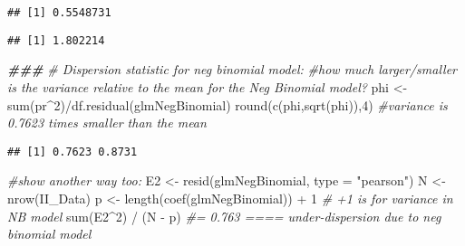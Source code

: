 \documentclass[
]{article}
\newenvironment{Shaded}{\begin{snugshade}}{\end{snugshade}}
\newcommand{\AttributeTok}[1]{\textcolor[rgb]{0.77,0.63,0.00}{#1}}
\newcommand{\CommentTok}[1]{\textcolor[rgb]{0.56,0.35,0.01}{\textit{#1}}}
\newcommand{\DecValTok}[1]{\textcolor[rgb]{0.00,0.00,0.81}{#1}}
\newcommand{\DocumentationTok}[1]{\textcolor[rgb]{0.56,0.35,0.01}{\textbf{\textit{#1}}}}
\newcommand{\FunctionTok}[1]{\textcolor[rgb]{0.00,0.00,0.00}{#1}}
\newcommand{\NormalTok}[1]{#1}
\newcommand{\OtherTok}[1]{\textcolor[rgb]{0.56,0.35,0.01}{#1}}
\newcommand{\SpecialCharTok}[1]{\textcolor[rgb]{0.00,0.00,0.00}{#1}}
\newcommand{\StringTok}[1]{\textcolor[rgb]{0.31,0.60,0.02}{#1}}
\begin{document}
\begin{verbatim}
## [1] 0.5548731
\end{verbatim}

\begin{Shaded}
\end{Shaded}

\begin{verbatim}
## [1] 1.802214
\end{verbatim}

\begin{Shaded}
\begin{Highlighting}[]
\DocumentationTok{\#\#\#}
\CommentTok{\# Dispersion statistic for neg binomial model:}
\CommentTok{\#how much larger/smaller is the variance relative to the mean for the Neg Binomial model?}
\NormalTok{phi }\OtherTok{\textless{}{-}} \FunctionTok{sum}\NormalTok{(pr}\SpecialCharTok{\^{}}\DecValTok{2}\NormalTok{)}\SpecialCharTok{/}\FunctionTok{df.residual}\NormalTok{(glmNegBinomial)}
\FunctionTok{round}\NormalTok{(}\FunctionTok{c}\NormalTok{(phi,}\FunctionTok{sqrt}\NormalTok{(phi)),}\DecValTok{4}\NormalTok{) }\CommentTok{\#variance is 0.7623 times smaller than the mean}
\end{Highlighting}
\end{Shaded}

\begin{verbatim}
## [1] 0.7623 0.8731
\end{verbatim}

\begin{Shaded}
\begin{Highlighting}[]
\CommentTok{\#show another way too:}
\NormalTok{E2 }\OtherTok{\textless{}{-}} \FunctionTok{resid}\NormalTok{(glmNegBinomial, }\AttributeTok{type =} \StringTok{"pearson"}\NormalTok{)}
\NormalTok{N  }\OtherTok{\textless{}{-}} \FunctionTok{nrow}\NormalTok{(II\_Data)}
\NormalTok{p  }\OtherTok{\textless{}{-}} \FunctionTok{length}\NormalTok{(}\FunctionTok{coef}\NormalTok{(glmNegBinomial)) }\SpecialCharTok{+} \DecValTok{1}  \CommentTok{\# \textquotesingle{}+1\textquotesingle{} is for variance in NB model}
\FunctionTok{sum}\NormalTok{(E2}\SpecialCharTok{\^{}}\DecValTok{2}\NormalTok{) }\SpecialCharTok{/}\NormalTok{ (N }\SpecialCharTok{{-}}\NormalTok{ p) }\CommentTok{\#= 0.763 ==== under{-}dispersion due to neg binomial model}
\end{Highlighting}
\end{Shaded}
\end{document}
